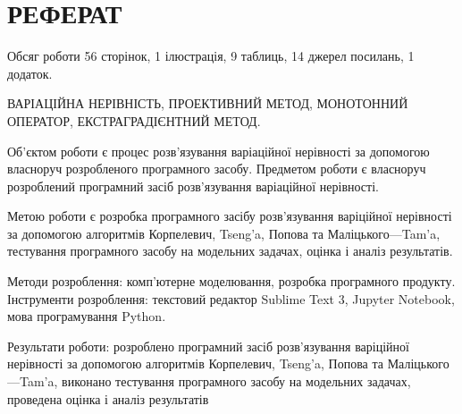 \chapter*[Реферат]{РЕФЕРАТ}
Обсяг роботи 56 сторінок, 1 ілюстрація, 9 таблиць, 14 джерел посилань, 1 додаток. \medskip

\MakeUppercase{Варіаційна нерівність, проективний метод, монотонний оператор, екстраградієнтний метод.} \medskip

Об'єктом роботи є процес розв'язування варіаційної нерівності за допомогою власноруч розробленого програмного засобу. Предметом роботи є власноруч розроблений програмний засіб розв'язування варіаційної нерівності. \medskip

Метою роботи є розробка програмного засібу розв'язування варіційної нерівності за допомогою алгоритмів Корпелевич, Tseng'a, Попова та Маліцького---Tam'a, тестування програмного засобу на модельних задачах, оцінка і аналіз результатів. \medskip

Методи розроблення: комп'ютерне моделювання, розробка програмного продукту. Інструменти розроблення: текстовий редактор Sublime Text 3, Jupyter Note\-book, мова програмування Python. \medskip

Результати роботи: розроблено програмний засіб розв'язування варіційної нерівності за допомогою алгоритмів Корпелевич, Tseng'a, Попова та Маліцького---Tam'a, виконано тестування програмного засобу на модельних задачах, проведена оцінка і аналіз результатів 
